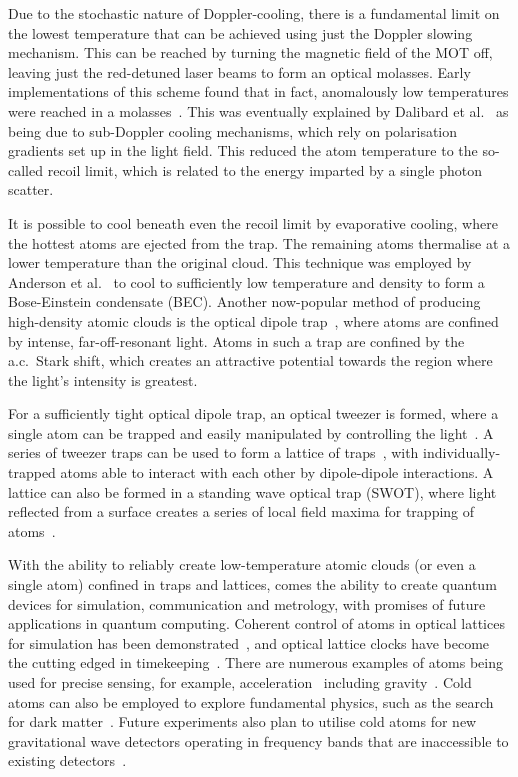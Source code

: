 Due to the stochastic nature of Doppler-cooling, there is a fundamental limit
on the lowest temperature that can be achieved using just the Doppler slowing
mechanism. This can be reached by turning the magnetic field of the MOT off,
leaving just the red-detuned laser beams to form an optical molasses. Early
implementations of this scheme found that in fact, anomalously low temperatures
were reached in a molasses~\cite{Lett1988}. This was eventually explained by
Dalibard et al.~\cite{Dalibard:89} as being due to sub-Doppler cooling
mechanisms, which rely on polarisation gradients set up in the light field.
This reduced the atom temperature to the so-called recoil limit, which is
related to the energy imparted by a single photon scatter.

It is possible to cool beneath even the recoil limit by evaporative cooling,
where the hottest atoms are ejected from the trap. The remaining atoms
thermalise at a lower temperature than the original cloud. This technique was
employed by Anderson et al.~\cite{Anderson198} to cool \esRb{} to sufficiently
low temperature and density to form a Bose-Einstein condensate (BEC). Another
now-popular method of producing high-density atomic clouds is the optical
dipole trap~\cite{Chu1986}, where atoms are confined by intense,
far-off-resonant light. Atoms in such a trap are confined by the a.c.\ Stark
shift, which creates an attractive potential towards the region where the
light's intensity is greatest.

For a sufficiently tight optical dipole trap, an optical tweezer is formed,
where a single atom can be trapped and easily manipulated by controlling the
light~\cite{Schlosser2001}. A series of tweezer traps can be used to form a
lattice of traps~\cite{Schlosser2001}, with individually-trapped atoms able to
interact with each other by dipole-dipole interactions. A lattice can also be
formed in a standing wave optical trap (SWOT), where light reflected from a
surface creates a series of local field maxima for trapping of
atoms~\cite{Wu2017}.

With the ability to reliably create low-temperature atomic clouds (or even a
single atom) confined in traps and lattices, comes the ability to create
quantum devices for simulation, communication and metrology, with promises of
future applications in quantum computing. Coherent control of atoms in optical
lattices for simulation has been demonstrated~\cite{Schafer2020}, and optical
lattice clocks have become the cutting edged in
timekeeping~\cite{PhysRevX.8.021036}. There are numerous examples of atoms
being used for precise sensing, for example, acceleration~\cite{Chen2019}
including gravity~\cite{Stray2022}. Cold atoms can also be employed to
explore fundamental physics, such as the search for dark
matter~\cite{Wcislo2018}. Future experiments also plan to utilise cold atoms
for new gravitational wave detectors operating in frequency bands that are
inaccessible to existing detectors~\cite{Badurina_2020}.


